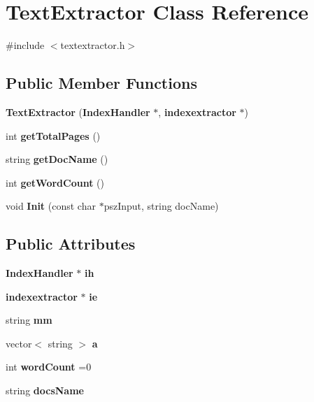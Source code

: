 \section{Text\+Extractor Class Reference}
\label{class_text_extractor}


{\ttfamily \#include $<$textextractor.\+h$>$}

\subsection*{Public Member Functions}
\begin{DoxyCompactItemize}
\item 
{\bfseries Text\+Extractor} ({\bf Index\+Handler} $\ast$, {\bf indexextractor} $\ast$)\label{class_text_extractor_a10caf1764ade9e474231adf781b367f7}

\item 
int {\bfseries get\+Total\+Pages} ()\label{class_text_extractor_a66e37d8e8161909dc786aa1a6a5f7637}

\item 
string {\bfseries get\+Doc\+Name} ()\label{class_text_extractor_a85ca0ccdb54737c6d5ac8dd681d5b1a8}

\item 
int {\bfseries get\+Word\+Count} ()\label{class_text_extractor_a8d3c038e06d44b5c173a53245ef2d7f2}

\item 
void {\bfseries Init} (const char $\ast$psz\+Input, string doc\+Name)\label{class_text_extractor_a5e99ac7195f139e6de81ecb444f220d7}

\end{DoxyCompactItemize}
\subsection*{Public Attributes}
\begin{DoxyCompactItemize}
\item 
{\bf Index\+Handler} $\ast$ {\bfseries ih}\label{class_text_extractor_a0394a5aac80ffd832e553a00cd06e768}

\item 
{\bf indexextractor} $\ast$ {\bfseries ie}\label{class_text_extractor_a53dff35095b3b6ac06db8565ed525c31}

\item 
string {\bfseries mm}\label{class_text_extractor_ab336de8579bd37a2623061457aa2c799}

\item 
vector$<$ string $>$ {\bfseries a}\label{class_text_extractor_a3b1a87ce7b4c17c085ea51cb7c2e446f}

\item 
int {\bfseries word\+Count} =0\label{class_text_extractor_ad8e30cc9eb1d54a17ca131b30d216990}

\item 
string {\bfseries docs\+Name}\label{class_text_extractor_acdf61457e2da0bd6a16db3624ba9ef71}

\end{DoxyCompactItemize}


